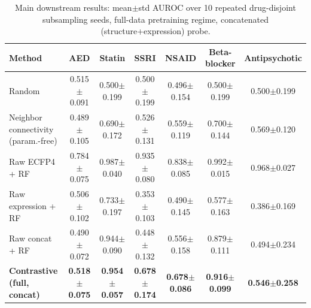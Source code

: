 \begin{table}[t]
\caption{Main downstream results: mean$\pm$std AUROC over 10 repeated drug-disjoint subsampling seeds, full-data pretraining regime, concatenated (structure+expression) probe.}
\label{tab:main}
\begin{center}\small
\begin{tabular}{lcccccc}
\toprule
Method & AED & Statin & SSRI & NSAID & Beta-blocker & Antipsychotic \\
\midrule
Random & 0.515$\pm$0.091 & 0.500$\pm$0.199 & 0.500$\pm$0.199 & 0.496$\pm$0.154 & 0.500$\pm$0.199 & 0.500$\pm$0.199 \\
Neighbor connectivity (param.-free) & 0.489$\pm$0.105 & 0.690$\pm$0.172 & 0.526$\pm$0.131 & 0.559$\pm$0.119 & 0.700$\pm$0.144 & 0.569$\pm$0.120 \\
Raw ECFP4 + RF & 0.784$\pm$0.075 & 0.987$\pm$0.040 & 0.935$\pm$0.080 & 0.838$\pm$0.085 & 0.992$\pm$0.015 & 0.968$\pm$0.027 \\
Raw expression + RF & 0.506$\pm$0.102 & 0.733$\pm$0.197 & 0.353$\pm$0.103 & 0.490$\pm$0.145 & 0.577$\pm$0.163 & 0.386$\pm$0.169 \\
Raw concat + RF & 0.490$\pm$0.072 & 0.944$\pm$0.090 & 0.448$\pm$0.132 & 0.556$\pm$0.158 & 0.879$\pm$0.111 & 0.494$\pm$0.234 \\
\textbf{Contrastive (full, concat)} & \textbf{0.518$\pm$0.075} & \textbf{0.954$\pm$0.057} & \textbf{0.678$\pm$0.174} & \textbf{0.678$\pm$0.086} & \textbf{0.916$\pm$0.099} & \textbf{0.546$\pm$0.258} \\
\bottomrule
\end{tabular}\end{center}\end{table}